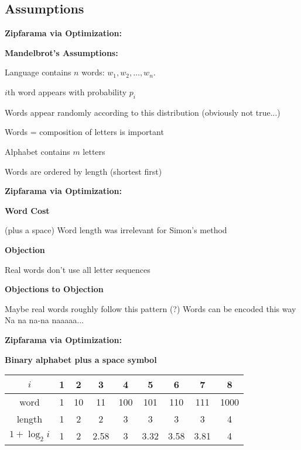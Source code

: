 \subsection{Assumptions}

  \textbf{Zipfarama via Optimization:}

  \textbf{Mandelbrot's Assumptions:}
    
     
      Language contains $n$ words: $w_1, w_2, \ldots, w_n$.
     
      $i$th word appears with probability $p_i$
     
      Words appear randomly according to this distribution (obviously not true...)
     
      Words = composition of letters is important
     
      Alphabet contains $m$ letters
     
      Words are ordered by length (shortest first)
    
  

  
  \textbf{Zipfarama via Optimization:}

  \textbf{Word Cost}
    
      (plus a space)
     Word length was irrelevant for Simon's method
    
  

\textbf{Objection}
  
   Real words don't use all letter sequences
  


\textbf{Objections to Objection}
  
   Maybe real words roughly follow this pattern (?)
   Words can be encoded this way
   Na na na-na naaaaa...
  


  \textbf{Zipfarama via Optimization:}

  \textbf{Binary alphabet plus a space symbol}
    \medskip
     {\small
    \begin{tabular}{|c|cccccccc|}
      \hline
      $i$ & 1 & 2 & 3 & 4 & 5 & 6 & 7 & 8 \\
      \hline
      word & 1 & 10 & 11 & 100 & 101 & 110 & 111 & 1000 \\
      \hline
      length & 1 & 2 & 2 & 3 & 3 & 3 & 3 & 4 \\
      \hline
      $1+\log_2 i$ & 1 & 2 & 2.58 & 3 & 3.32 & 3.58 & 3.81 & 4 \\
      \hline
    \end{tabular}
    }
  

